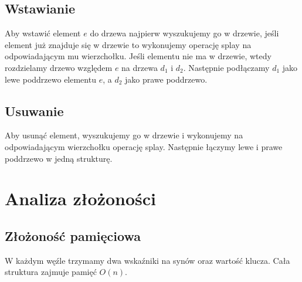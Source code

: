 \documentclass[declaration,shortabstract]{iithesis}
\theoremstyle{thm}
\theoremstyle{remark}
\theoremstyle{plain}
\theoremstyle{plain}
\theoremstyle{plain}
\begin{document}
\subsection{Wstawianie} 
Aby wstawić element \(e\) do drzewa najpierw wyszukujemy go w drzewie, jeśli element już znajduje się w drzewie to wykonujemy operację splay na odpowiadającym mu wierzchołku. Jeśli elementu nie ma w drzewie, wtedy rozdzielamy drzewo względem \(e\) na drzewa \(d_1\) i \( d_2\). Następnie podłączamy \(d_1\) jako lewe poddrzewo elementu  \(e\), a \(d_2\) jako prawe poddrzewo.  

\subsection{Usuwanie} 
Aby usunąć element, wyszukujemy go w drzewie i wykonujemy na odpowiadającym wierzchołku operację splay. Następnie łączymy lewe i prawe poddrzewo w jedną strukturę.  

\section{Analiza złożoności}  

\subsection{Złożoność pamięciowa} 
W każdym węźle trzymamy dwa wskaźniki na synów oraz wartość klucza. Cała struktura zajmuje pamięć $ O(n)$.  
\end{document}
